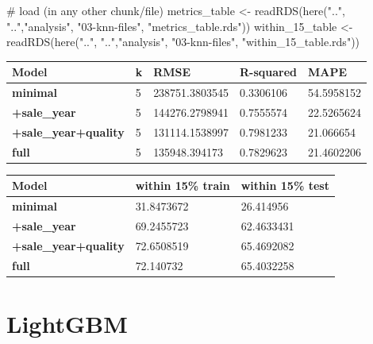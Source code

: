 \documentclass[
  english,
  letterpaper,
  DIV=11,
  numbers=noendperiod]{scrreprt}
\newenvironment{Shaded}{\begin{snugshade}}{\end{snugshade}}
\newcommand{\CommentTok}[1]{\textcolor[rgb]{0.37,0.37,0.37}{#1}}
\newcommand{\FunctionTok}[1]{\textcolor[rgb]{0.28,0.35,0.67}{#1}}
\newcommand{\NormalTok}[1]{\textcolor[rgb]{0.00,0.23,0.31}{#1}}
\newcommand{\OtherTok}[1]{\textcolor[rgb]{0.00,0.23,0.31}{#1}}
\newcommand{\StringTok}[1]{\textcolor[rgb]{0.13,0.47,0.30}{#1}}
\begin{document}
\begin{Shaded}
\begin{Highlighting}[]
\CommentTok{\# load (in any other chunk/file)}
\NormalTok{metrics\_table   }\OtherTok{\textless{}{-}} \FunctionTok{readRDS}\NormalTok{(}\FunctionTok{here}\NormalTok{(}\StringTok{".."}\NormalTok{, }\StringTok{".."}\NormalTok{,}\StringTok{"analysis"}\NormalTok{, }\StringTok{"03{-}knn{-}files"}\NormalTok{, }\StringTok{"metrics\_table.rds"}\NormalTok{))}
\NormalTok{within\_15\_table }\OtherTok{\textless{}{-}} \FunctionTok{readRDS}\NormalTok{(}\FunctionTok{here}\NormalTok{(}\StringTok{".."}\NormalTok{, }\StringTok{".."}\NormalTok{,}\StringTok{"analysis"}\NormalTok{, }\StringTok{"03{-}knn{-}files"}\NormalTok{, }\StringTok{"within\_15\_table.rds"}\NormalTok{))}
\end{Highlighting}
\end{Shaded}

\begin{longtable}[]{@{}lllll@{}}
\toprule\noalign{}
Model & k & RMSE & R-squared & MAPE \\
\midrule\noalign{}
\endhead
\bottomrule\noalign{}
\endlastfoot
\textbf{minimal} & 5 & 238751.3803545 & 0.3306106 & 54.5958152 \\
\textbf{+sale\_year} & 5 & 144276.2798941 & 0.7555574 & 22.5265624 \\
\textbf{+sale\_year+quality} & 5 & 131114.1538997 & 0.7981233 &
21.066654 \\
\textbf{full} & 5 & 135948.394173 & 0.7829623 & 21.4602206 \\
\end{longtable}

\begin{longtable}[]{@{}lll@{}}
\toprule\noalign{}
Model & within 15\% train & within 15\% test \\
\midrule\noalign{}
\endhead
\bottomrule\noalign{}
\endlastfoot
\textbf{minimal} & 31.8473672 & 26.414956 \\
\textbf{+sale\_year} & 69.2455723 & 62.4633431 \\
\textbf{+sale\_year+quality} & 72.6508519 & 65.4692082 \\
\textbf{full} & 72.140732 & 65.4032258 \\
\end{longtable}


\chapter{LightGBM}\label{lightgbm}
\end{document}
